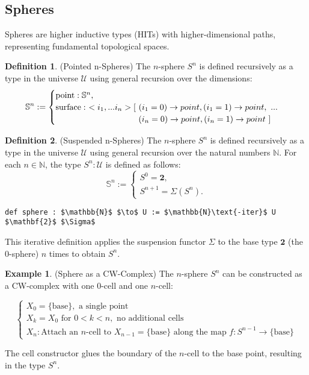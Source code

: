 \documentclass{article}
\theoremstyle{definition}
\newtheorem{definition}{Definition}
\newtheorem{example}{Example}
\begin{document}
\newpage
\subsection{Spheres}
Spheres are higher inductive types (HITs) with higher-dimensional
paths, representing fundamental topological spaces.

\begin{definition} (Pointed n-Spheres)
The $n$-sphere $S^n$ is defined recursively as a type in the
universe $\mathcal{U}$ using general recursion over the dimensions:
\[
\mathbb{S}^n :=
\begin{cases}
\text{point} : \mathbb{S}^n, \\
\text{surface} :\ <i_1,...i_n> [\ (i_1=0) \rightarrow point, (i_1=1) \rightarrow point,\ ... \\
\hspace{3.47cm} (i_n=0) \rightarrow point, (i_n=1) \rightarrow point\ ]
\end{cases}
\]
\end{definition}

\begin{definition} (Suspended n-Spheres)
The $n$-sphere $S^n$ is defined recursively as a type in the
universe $\mathcal{U}$ using general recursion over the natural
numbers $\mathbb{N}$. For each $n \in \mathbb{N}$,
the type $S^n : \mathcal{U}$ is defined as follows:
\[
\mathbb{S}^n :=
\begin{cases}
S^0 = \mathbf{2}, \\
S^{n+1} = \Sigma(S^n).
\end{cases}
\]
\begin{lstlisting}[mathescape=true]
def sphere : $\mathbb{N}$ $\to$ U := $\mathbb{N}\text{-iter}$ U $\mathbf{2}$ $\Sigma$
\end{lstlisting}
This iterative definition applies the suspension functor $\Sigma$
to the base type $\mathbf{2}$ (the 0-sphere) $n$ times to obtain $S^n$.
\end{definition}

\begin{example} (Sphere as a CW-Complex)
The $n$-sphere $S^n$ can be constructed as a CW-complex with
one 0-cell and one $n$-cell:

\[
\begin{cases}
X_0 = \{ \text{base} \}, \text{ a single point} \\
X_k = X_0 \text{ for } 0 < k < n, \text{ no additional cells} \\
X_n: \text{Attach an } n\text{-cell to } X_{n-1} = \{ \text{base} \} \text{ along the map } f : S^{n-1} \to \{ \text{base} \}
\end{cases}
\]

The $\text{cell}$ constructor glues the boundary of the $n$-cell
to the base point, resulting in the type $S^n$.
\end{example}
\end{document}
